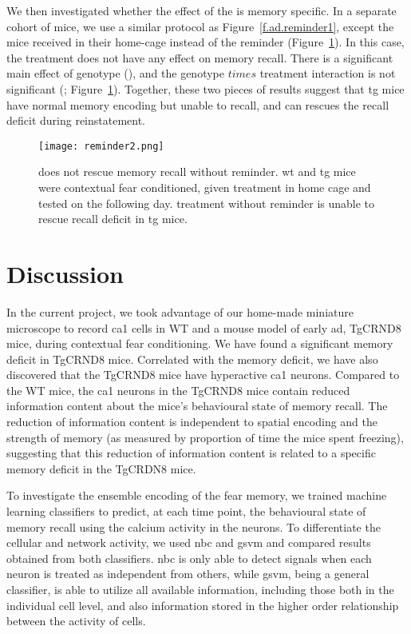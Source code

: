 We then investigated whether the effect of the \tglu{} is memory specific. In a separate cohort of mice, we use a similar protocol as Figure~\ref{f.ad.reminder1}, except the mice received \tglu{} in their home-cage instead of the reminder (Figure~\ref{f.ad.reminder2}). In this case, the \tglu{} treatment does not have any effect on memory recall. There is a significant main effect of genotype (), and the genotype $times$ treatment interaction is not significant (; Figure~\ref{f.ad.reminder2}). Together, these two pieces of results suggest that \gls{tg} mice have normal memory encoding but unable to recall, and \tglu{} can rescues the recall deficit during reinstatement. 


\begin{figure}[h]
    \texttt{[image: reminder2.png]}
    \caption[\tglu{} treatment does not rescue memory recall without reminder.]{\tglu{} does not rescue memory recall without reminder. \gls{wt} and \gls{tg} mice were contextual fear conditioned, given treatment in home cage and tested on the following day. \tglu{} treatment without reminder is unable to rescue recall deficit in \gls{tg} mice. \label{f.ad.reminder2}}
\end{figure}

\section{Discussion}


In the current project, we took advantage of our home-made miniature microscope to record \gls{ca1} cells in WT and a mouse model of early \gls{ad}, TgCRND8 mice, during contextual fear conditioning. We have found a significant memory deficit in TgCRND8 mice. Correlated with the memory deficit, we have also discovered that the TgCRND8 mice have hyperactive \gls{ca1} neurons. Compared to the WT mice, the \gls{ca1} neurons in the TgCRND8 mice contain reduced information content about the mice's behavioural state of memory recall. The reduction of information content is independent to spatial encoding and the strength of memory (as measured by proportion of time the mice spent freezing), suggesting that this reduction of information content is related to a specific memory deficit in the TgCRDN8 mice.

To investigate the ensemble encoding of the fear memory, we trained machine learning classifiers to predict, at each time point, the behavioural state of memory recall using the calcium activity in the neurons. To differentiate the cellular and network activity, we used \gls{nbc} and \gls{gsvm} and compared results obtained from both classifiers. \Gls{nbc} is only able to detect signals when each neuron is treated as independent from others, while \gls{gsvm}, being a general classifier, is able to utilize all available information, including those both in the individual cell level, and also information stored in the higher order relationship between the activity of cells. 

